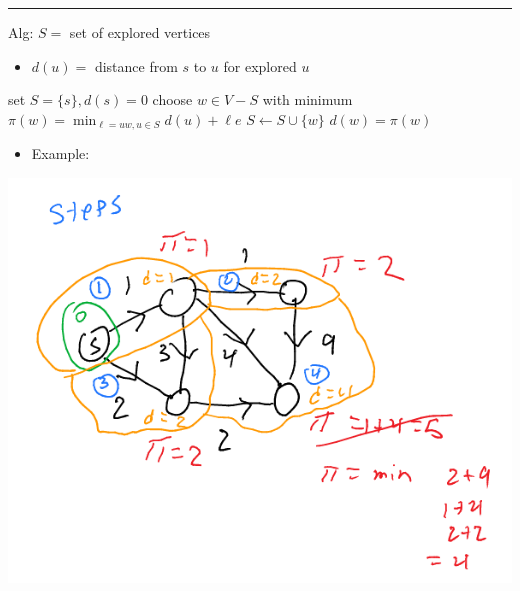 \documentclass[11pt]{article}
\begin{document}
\noindent\rule{\textwidth}{0.5pt}
Alg: \(S =\) set of explored vertices
\begin{itemize}
\item \(d(u)=\) distance from \(s\) to \(u\) for explored \(u\)
\end{itemize}
\begin{algorithmic}
  \State set $S = \{s\}, d(s)=0$
   choose $w \in V-S$ with minimum
  $\pi(w)=\min_{\ell=uw,u\in S}d(u)+\ell e$
  \State $S \gets S \cup \{w\}$
  \State $d(w)=\pi(w)$
  \EndWhile
\end{algorithmic}
\begin{itemize}
\item Example:
\end{itemize}
\begin{center}
\includegraphics[width=.9\linewidth]{./Images/i38.png}
\end{center}
\end{document}
